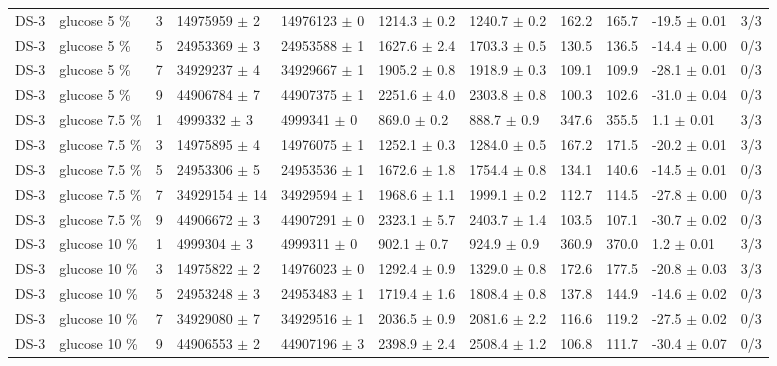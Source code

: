\documentclass[11pt,a4paper]{article}
\begin{document}
\begin{landscape}
{\begin{longtable}{@{}lllllllllll@{}}
DS-3 & glucose 5 \% & 3 & 14975959 $\pm$ 2 & 14976123 $\pm$ 0 & 1214.3 $\pm$ 0.2 & 1240.7 $\pm$ 0.2 & 162.2 & 165.7 & -19.5 $\pm$ 0.01 & 3/3 \\
DS-3 & glucose 5 \% & 5 & 24953369 $\pm$ 3 & 24953588 $\pm$ 1 & 1627.6 $\pm$ 2.4 & 1703.3 $\pm$ 0.5 & 130.5 & 136.5 & -14.4 $\pm$ 0.00 & 0/3 \\
DS-3 & glucose 5 \% & 7 & 34929237 $\pm$ 4 & 34929667 $\pm$ 1 & 1905.2 $\pm$ 0.8 & 1918.9 $\pm$ 0.3 & 109.1 & 109.9 & -28.1 $\pm$ 0.01 & 0/3 \\
DS-3 & glucose 5 \% & 9 & 44906784 $\pm$ 7 & 44907375 $\pm$ 1 & 2251.6 $\pm$ 4.0 & 2303.8 $\pm$ 0.8 & 100.3 & 102.6 & -31.0 $\pm$ 0.04 & 0/3 \\
DS-3 & glucose 7.5 \% & 1 & 4999332 $\pm$ 3 & 4999341 $\pm$ 0 & 869.0 $\pm$ 0.2 & 888.7 $\pm$ 0.9 & 347.6 & 355.5 & 1.1 $\pm$ 0.01 & 3/3 \\
DS-3 & glucose 7.5 \% & 3 & 14975895 $\pm$ 4 & 14976075 $\pm$ 1 & 1252.1 $\pm$ 0.3 & 1284.0 $\pm$ 0.5 & 167.2 & 171.5 & -20.2 $\pm$ 0.01 & 3/3 \\
DS-3 & glucose 7.5 \% & 5 & 24953306 $\pm$ 5 & 24953536 $\pm$ 1 & 1672.6 $\pm$ 1.8 & 1754.4 $\pm$ 0.8 & 134.1 & 140.6 & -14.5 $\pm$ 0.01 & 0/3 \\
DS-3 & glucose 7.5 \% & 7 & 34929154 $\pm$ 14 & 34929594 $\pm$ 1 & 1968.6 $\pm$ 1.1 & 1999.1 $\pm$ 0.2 & 112.7 & 114.5 & -27.8 $\pm$ 0.00 & 0/3 \\
DS-3 & glucose 7.5 \% & 9 & 44906672 $\pm$ 3 & 44907291 $\pm$ 0 & 2323.1 $\pm$ 5.7 & 2403.7 $\pm$ 1.4 & 103.5 & 107.1 & -30.7 $\pm$ 0.02 & 0/3 \\
DS-3 & glucose 10 \% & 1 & 4999304 $\pm$ 3 & 4999311 $\pm$ 0 & 902.1 $\pm$ 0.7 & 924.9 $\pm$ 0.9 & 360.9 & 370.0 & 1.2 $\pm$ 0.01 & 3/3 \\
DS-3 & glucose 10 \% & 3 & 14975822 $\pm$ 2 & 14976023 $\pm$ 0 & 1292.4 $\pm$ 0.9 & 1329.0 $\pm$ 0.8 & 172.6 & 177.5 & -20.8 $\pm$ 0.03 & 3/3 \\
DS-3 & glucose 10 \% & 5 & 24953248 $\pm$ 3 & 24953483 $\pm$ 1 & 1719.4 $\pm$ 1.6 & 1808.4 $\pm$ 0.8 & 137.8 & 144.9 & -14.6 $\pm$ 0.02 & 0/3 \\
DS-3 & glucose 10 \% & 7 & 34929080 $\pm$ 7 & 34929516 $\pm$ 1 & 2036.5 $\pm$ 0.9 & 2081.6 $\pm$ 2.2 & 116.6 & 119.2 & -27.5 $\pm$ 0.02 & 0/3 \\
DS-3 & glucose 10 \% & 9 & 44906553 $\pm$ 2 & 44907196 $\pm$ 3 & 2398.9 $\pm$ 2.4 & 2508.4 $\pm$ 1.2 & 106.8 & 111.7 & -30.4 $\pm$ 0.07 & 0/3 \\
\bottomrule
\end{longtable}}\end{landscape}
\end{document}
